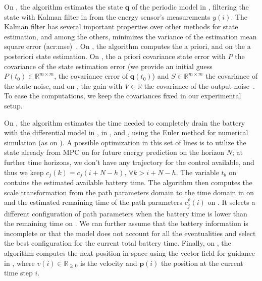 On , the algorithm estimates the state $\mathbf{q}$ of the periodic model in , filtering the state with Kalman filter in  from the energy sensor's measurements $y(i)$. The Kalman filter has several important properties over other methods for state estimation, and among the others, minimizes the variance of the estimation mean square error (\Gls{acr:mse})~\citep{kalman1960new,simon2006optimal,jwo2007practical}. On , the algorithm computes the a priori, and on  the a posteriori state estimation. On , the a priori covariance state error with $P$ the covariance of the state estimation error (we provide an initial guess $P(t_0)\in\mathbb{R}^{m\times m}$, the covariance error of $\mathbf{q}(t_0)$) and $S\in\mathbb{R}^{m\times m}$ the covariance of the state noise, and on , the gain with $V\in\mathbb{R}$ the covariance of the output noise~\citep{simon2006optimal}. To ease the computations, we keep the covariances fixed in our experimental setup.

On , the algorithm estimates the time needed to completely drain the battery with the differential model in , in , and , using the Euler method for numerical simulation (as on ). A possible optimization in this set of lines is to utilize the state already from MPC on  for future energy prediction on the horizon $N$; at further time horizons, we don’t have any trajectory for the control available, and thus we keep $c_j(k)=c_j(i+N-h),\,\forall k>i+N-h$. The variable $t_b$ on  contains the estimated available battery time. The algorithm then computes the scale transformation from the path parameters domain to the time domain in  on  and the estimated remaining time of the path parameters $c_j^\rho(i)$ on . It selects a different configuration of path parameters when the battery time is lower than the remaining time on . We can further assume that the battery information is incomplete or that the model does not account for all the eventualities and select the best configuration for the current total battery time. Finally, on , the algorithm computes the next position in space using the vector field for guidance in , where $v(i)\in\mathbb{R}_{\geq 0}$ is the velocity and $\mathbf{p}(i)$ the position at the current time step $i$. 


